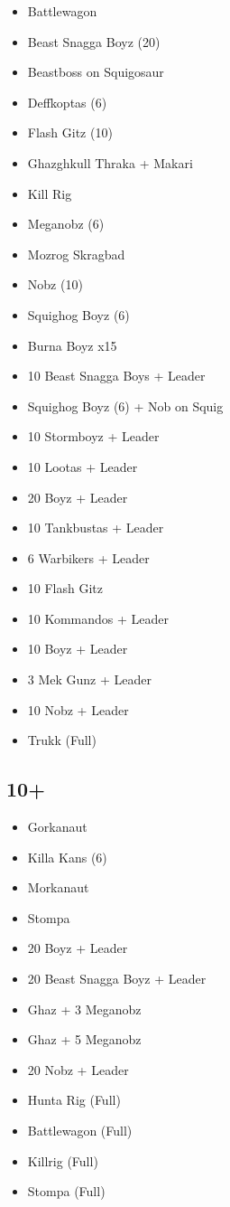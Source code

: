 \documentclass{HordeModeTarot}
\begin{document}
\begin{multicols}{2}
\begin{itemize}[leftmargin=*]
\item[] Battlewagon
\item[] Beast Snagga Boyz (20)
\item[] Beastboss on Squigosaur
\item[] Deffkoptas (6)
\item[] Flash Gitz (10)
\item[] Ghazghkull Thraka + Makari
\item[] Kill Rig
\item[] Meganobz (6)
\item[] Mozrog Skragbad
\item[] Nobz (10)
\item[] Squighog Boyz (6)
\item[] Burna Boyz x15
\item[] 10 Beast Snagga Boys + Leader
\item[] Squighog Boyz (6) + Nob on Squig
\item[] 10 Stormboyz + Leader
\item[] 10 Lootas + Leader
\item[] 20 Boyz + Leader
\item[] 10 Tankbustas + Leader
\item[] 6 Warbikers + Leader
\item[] 10 Flash Gitz
\item[] 10 Kommandos + Leader
\item[] 10 Boyz + Leader
\item[] 3 Mek Gunz + Leader
\item[] 10 Nobz + Leader
\item[] Trukk (Full)
\end{itemize}

\subsection*{10+}

\begin{itemize}[leftmargin=*]
\item[] Gorkanaut
\item[] Killa Kans (6)
\item[] Morkanaut
\item[] Stompa
\item[] 20 Boyz + Leader
\item[] 20 Beast Snagga Boyz + Leader
\item[] Ghaz + 3 Meganobz
\item[] Ghaz + 5 Meganobz
\item[] 20 Nobz + Leader
\item[] Hunta Rig (Full)
\item[] Battlewagon (Full)
\item[] Killrig (Full)
\item[] Stompa (Full)
\end{itemize}


\end{multicols}
\end{document}
